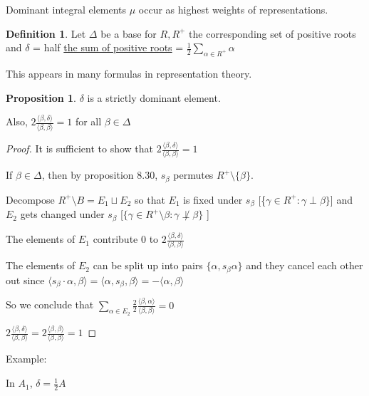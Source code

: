 \documentclass{article}
\theoremstyle{definition}
\newtheorem{definition}{Definition}
\newtheorem{proposition}{Proposition}
\begin{document}
Dominant integral elements \(\mu\) occur as highest weights of representations.

\begin{definition}
    Let \(\Delta\) be a base for \(R, R^+\) the corresponding set of positive roots and \(\delta\) = half \underline{the sum of positive roots} = \(\frac{1}{2} \sum_{\alpha \in R^+ } \alpha\) 
\end{definition}

This appears in many formulas in representation theory.

\begin{proposition}
    \(\delta\) is a strictly dominant element.

    Also, \(2\frac{\langle \beta ,\delta \rangle }{\langle \beta ,\beta  \rangle } = 1\) for all \(\beta \in \Delta\)
\end{proposition}

\begin{proof}
    It is sufficient to show that \(2 \frac{\langle \beta ,\delta  \rangle }{\langle \beta ,\beta  \rangle} = 1\) 

    If \(\beta \in \Delta\), then by proposition 8.30, \(s_\beta\) permutes \(R^+ \setminus \{ \beta \} \).

    Decompose \(R^+ \setminus B = E_1 \sqcup E_2\) so that \(E_1\) is fixed under \(s_\beta\) [\{\(\gamma \in R^+ : \gamma \perp \beta \}\)] and \(E_2\) gets changed under \(s_\beta \) [\(\{ \gamma \in R^+ \setminus \beta : \gamma \not\perp \beta \} \) ] 

    The elements of \(E_1\) contribute \(0\) to \(2\frac{\langle \beta ,\delta \rangle }{\langle \beta ,\beta  \rangle }\) 

    The elements of \(E_2\) can be split up into pairs \(\{ \alpha ,s_\beta \alpha \} \) and they cancel each other out since \(\langle s_\beta\cdot \alpha , \beta  \rangle = \langle \alpha , s_\beta ,\beta \rangle = - \langle \alpha ,\beta  \rangle \) 

    So we conclude that \(\sum_{\alpha \in E_2}^{} \frac{2}{2}\frac{\langle \beta ,\alpha  \rangle }{\langle \beta ,\beta  \rangle } = 0\) 

    \(2 \frac{\langle \beta ,\delta  \rangle }{\langle \beta ,\beta  \rangle } = 2\frac{\langle \beta ,\beta  \rangle }{\langle \beta ,\beta  \rangle } = 1\) 

\end{proof}

Example:

In \(A_1\), \(\delta = \frac{1}{2}A\) 
\end{document}
